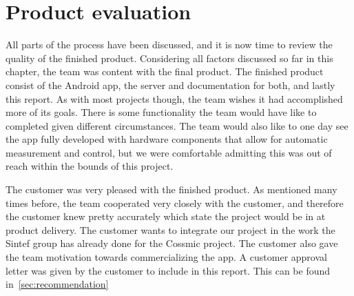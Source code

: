 \section{Product evaluation}
All parts of the process have been discussed, and it is now time to review the quality of the finished product. Considering all factors discussed so far in this chapter, the team was content with the final product. The finished product consist of the Android app, the server and documentation for both, and lastly this report. As with most projects though, the team wishes it had accomplished more of its goals. There is some functionality the team would have like to completed given different circumstances. The team would also like to one day see the app  fully developed with hardware components that allow for automatic measurement and control, but we were comfortable admitting this was out of reach within the bounds of this project. 

The customer was very pleased with the finished product. As mentioned many times before, the team cooperated very closely with the customer, and therefore the customer knew pretty accurately which state the project would be in at product delivery. The customer wants to integrate our project in the work the Sintef group has already done for the Cossmic project. The customer also gave the team motivation towards commercializing the app. A customer approval letter was given by the customer to include in this report. This can be found in~\ref{sec:recommendation}